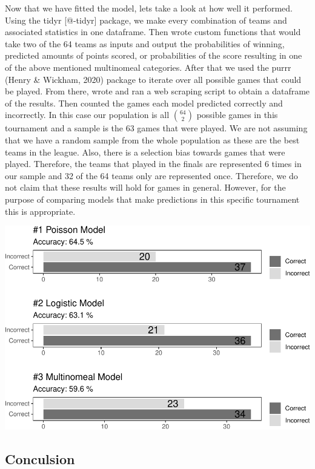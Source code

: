 \documentclass[
  man,floatsintext]{apa6}
\begin{document}
Now that we have fitted the model, lets take a look at how well it performed. Using the tidyr {[}@-tidyr{]} package, we make every combination of teams and associated statistics in one dataframe. Then wrote custom functions that would take two of the 64 teams as inputs and output the probabilities of winning, predicted amounts of points scored, or probabilities of the score resulting in one of the above mentioned multinomeal categories. After that we used the purrr (Henry \& Wickham, 2020) package to iterate over all possible games that could be played. From there, wrote and ran a web scraping script to obtain a dataframe of the results. Then counted the games each model predicted correctly and incorrectly. In this case our population is all \({64\choose 2}\) possible games in this tournament and a sample is the 63 games that were played. We are not assuming that we have a random sample from the whole population as these are the best teams in the league. Also, there is a selection bias towards games that were played. Therefore, the teams that played in the finals are represented 6 times in our sample and 32 of the 64 teams only are represented once. Therefore, we do not claim that these results will hold for games in general. However, for the purpose of comparing models that make predictions in this specific tournament this is appropriate.

\includegraphics{paper_files/figure-latex/unnamed-chunk-6-1.pdf}

\hypertarget{conculsion}{%
\subsection{Conculsion}\label{conculsion}}
\end{document}
